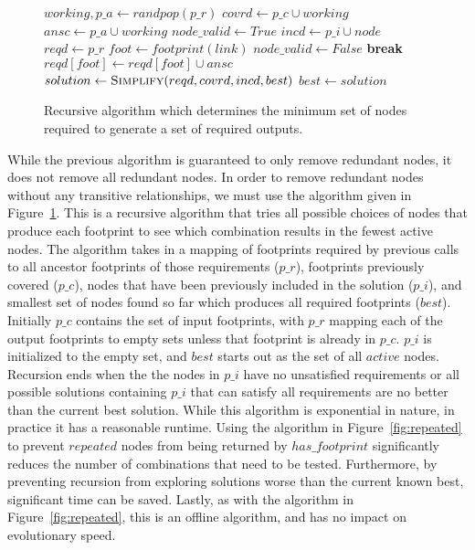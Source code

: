 \documentclass[journal]{IEEEtran}
\begin{document}
\begin{figure}
  \begin{algorithmic}
      \State{}
      \State{}
    \EndIf
    \State $working, p\_a \leftarrow randpop(p\_r)$
    \State $covrd \leftarrow p\_c \cup {working}$
    \State $ansc \leftarrow p\_a \cup {working}$
      \State $node\_valid \leftarrow True$
      \State $incd \leftarrow p\_i \cup {node}$
      \State $reqd \leftarrow p\_r$
        \State $foot \leftarrow footprint(link)$
          \State $node\_valid \leftarrow False$
          \State \textbf{break}
          \State $reqd[foot] \leftarrow reqd[foot] \cup ansc$
        \EndIf
      \EndFor
        \State $solution \leftarrow \Call{Simplify}{reqd, covrd, incd, best}$
          \State $best \leftarrow solution$
        \EndIf
      \EndIf
    \EndFor
    \State{}
  \EndProcedure
  \end{algorithmic}
  \caption{Recursive algorithm which determines the minimum set of nodes required
    to generate a set of required outputs.}
  \label{fig:simplify}
\end{figure}

While the previous algorithm is guaranteed to only remove redundant nodes, it
does not remove all redundant nodes.  In order to remove redundant nodes without
any transitive relationships, we must use the algorithm given in
Figure~\ref{fig:simplify}.  This is a recursive algorithm that tries all possible
choices of nodes that produce each footprint to see which combination results
in the fewest active nodes.  The algorithm takes in a mapping of footprints
required by previous calls to all ancestor footprints of those requirements ($p\_r$), footprints previously covered ($p\_c$),
nodes that have been previously included in the solution ($p\_i$), and smallest
set of nodes found so far which produces all required footprints ($best$).  Initially
$p\_c$ contains the set of input footprints, with $p\_r$ mapping each of the output
footprints to empty sets unless that footprint is already in $p\_c$.  $p\_i$
is initialized to the empty set, and $best$ starts out as the set of all $active$ nodes.
Recursion ends when the the nodes in $p\_i$ have no unsatisfied requirements or
all possible solutions containing $p\_i$ that can satisfy all requirements are
no better than the current best solution.  While this algorithm is exponential
in nature, in practice it has a reasonable runtime.  Using the algorithm in
Figure~\ref{fig:repeated} to prevent $repeated$ nodes from being returned by
$has\_footprint$ significantly reduces the number of combinations that need
to be tested.  Furthermore, by preventing recursion from exploring solutions
worse than the current known best, significant time can be saved.  Lastly, as
with the algorithm in Figure~\ref{fig:repeated}, this is an offline algorithm,
and has no impact on evolutionary speed.
\end{document}
